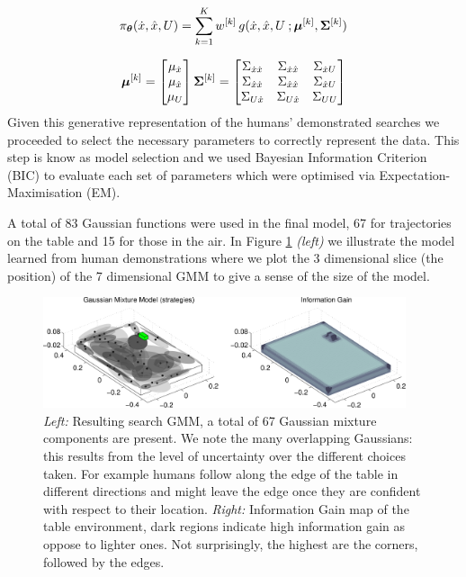 \begin{equation} \label{eq:gmm2}
 \pi_{\boldsymbol{\theta}}(\dot{x},\hat{x},U) = \sum\limits_{k=1}^{K} w^{[k]}\, g(\dot{x},\hat{x},U\: ;\boldsymbol{\mu}^{[k]},\boldsymbol{\Sigma}^{[k]} )
\end{equation}

\begin{equation*}
    \boldsymbol{\mu}^{[k]} =
    \begin{bmatrix}
      \mu_{\dot{x}} \\
      \mu_{\hat{x}} \\
      \mu_{U}
    \end{bmatrix}
    \boldsymbol{\Sigma}^{[k]} =
    \begin{bmatrix}
      \Sigma_{\dot{x}\dot{x}} & \Sigma_{\dot{x}\hat{x}} & \Sigma_{\dot{x}U} \\
      \Sigma_{\hat{x}\dot{x}} & \Sigma_{\hat{x}\hat{x}} & \Sigma_{\hat{x}U} \\
      \Sigma_{U\dot{x}} & \Sigma_{U\hat{x}} & \Sigma_{UU}   
    \end{bmatrix}
\end{equation*}
Given this generative representation of the humans' demonstrated searches we proceeded to 
select the necessary parameters to correctly represent the data. This step
is know as model selection and we used Bayesian Information Criterion (BIC) to evaluate
each set of parameters which were optimised via Expectation-Maximisation (EM). 

A total of 83 Gaussian functions were used in the final model, 67 for trajectories on the table and 15 for those in the air. In Figure
\ref{fig:gmm} \textit{(left)} we illustrate the model learned from human demonstrations where we plot the 3 dimensional slice (the position) of the 7
dimensional GMM to give a sense of the size of the model.

\begin{figure}
\centering
  \includegraphics[width=0.95\textwidth]{./ch3-Search/Figures/Figure4}
  \caption{\textit{Left: } Resulting search GMM, a total of 67 Gaussian mixture components are present. We note the many overlapping Gaussians: this results
from the level of uncertainty over the different choices taken. For example humans follow along the edge of the table in different directions and might
leave the edge once they are confident with respect to their location. \textit{Right:} Information Gain map of the table environment, dark regions indicate 
high information gain as oppose to lighter ones. Not surprisingly, the highest are the corners, followed by the edges.}
  \label{fig:gmm}
\end{figure}

